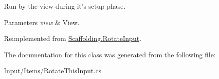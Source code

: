 Run by the view during it's setup phase. 


\begin{DoxyParams}{Parameters}
{\em view} & View.\\
\hline
\end{DoxyParams}


Reimplemented from \hyperlink{class_scaffolding_1_1_rotate_input_a89be6ed5c624ff8f637fdc38227c4637}{Scaffolding.\+Rotate\+Input}.



The documentation for this class was generated from the following file\+:\begin{DoxyCompactItemize}
\item 
Input/\+Items/Rotate\+This\+Input.\+cs\end{DoxyCompactItemize}
